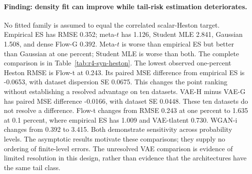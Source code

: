\documentclass[11pt]{article}
\theoremstyle{definition}\newtheorem{definition}[theorem]{Definition}
\theoremstyle{remark}\newtheorem{remark}[theorem]{Remark}
\begin{document}
\paragraph{Finding: density fit can improve while tail-risk estimation deteriorates.}
No fitted family is assumed to equal the correlated scalar-Heston target. Empirical ES has RMSE 0.352; meta-$t$ has 1.126, Student MLE 2.841, Gaussian 1.508, and dense Flow-G 0.392. Meta-$t$ is worse than empirical ES but better than Gaussian at one percent; Student MLE is worse than both. The complete comparison is in Table~\ref{tab:r4-syn-heston}.
The lowest observed one-percent Heston RMSE is Flow-t at 0.243. Its paired MSE difference from empirical ES is -0.0653, with dataset dispersion SE 0.0675. This changes the point ranking without establishing a resolved advantage on ten datasets.
VAE-H minus VAE-G has paired MSE difference -0.0166, with dataset SE 0.0448. These ten datasets do not resolve a difference. Flow-t changes from RMSE 0.243 at one percent to 1.635 at 0.1 percent, where empirical ES has 1.009 and VAE-tlatent 0.730. WGAN-i changes from 0.392 to 3.415. Both demonstrate sensitivity across probability levels. The asymptotic results motivate these comparisons; they supply no ordering of finite-level errors. The unresolved VAE comparison is evidence of limited resolution in this design, rather than evidence that the architectures have the same tail class.
\end{document}
